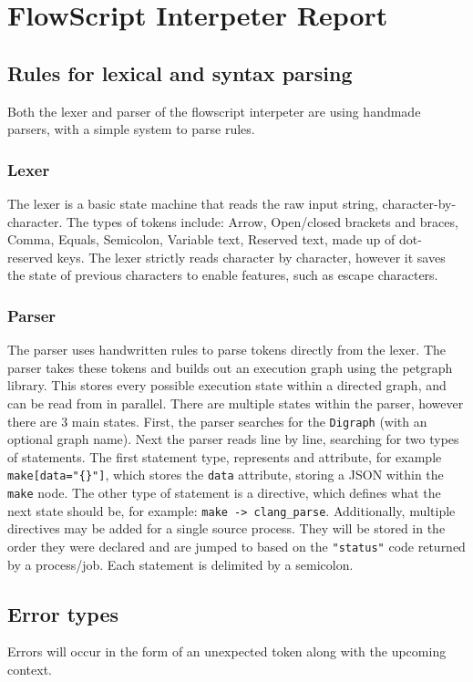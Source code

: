 \documentclass{article}
\begin{document}
\section*{FlowScript Interpeter Report}
	\subsection{Rules for lexical and syntax parsing}
		Both the lexer and parser of the flowscript interpeter are using handmade parsers, with a simple system to parse rules.
		\subsubsection{Lexer}
			The lexer is a basic state machine that reads the raw input string, character-by-character. The types of tokens include: Arrow, Open/closed  brackets and braces, Comma, Equals, Semicolon, Variable text, Reserved text, made up of dot-reserved keys. The lexer strictly reads character by character, however it saves the state of previous characters to enable features, such as escape characters.
		\subsubsection{Parser}
			The parser uses handwritten rules to parse tokens directly from the lexer. The parser takes these tokens and builds out an execution graph using the petgraph library. This stores every possible execution state within a directed graph, and can be read from in parallel. There are multiple states within the parser, however there are 3 main states. First, the parser searches for the \texttt{Digraph} (with an optional graph name). Next the parser reads line by line, searching for two types of statements. The first statement type, represents and attribute, for example \texttt{make[data="\{\}"]}, which stores the \texttt{data} attribute, storing a JSON within the \texttt{make} node. The other type of statement is a directive, which defines what the next state should be, for example: \texttt{make -> clang\_parse}. Additionally, multiple directives may be added for a single source process. They will be stored in the order they were declared and are jumped to based on the \texttt{"status"} code returned by a process/job. Each statement is delimited by a semicolon.
	\subsection{Error types}
		Errors will occur in the form of an unexpected token along with the upcoming context. \\ \\
		
\end{document}
